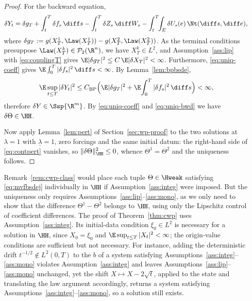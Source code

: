 \begin{proof}
For the backward equation,
\[
\delta Y_t=\delta g_T+\int_t^T\delta f_s\,\diff s-\int_t^T\delta Z_s\,\diff W_s
-\int_t^T\!\!\int_E\delta U_s(e)\,\Nt(\diff s,\diff e),
\]
where $\delta g_T:=g(X^1_T,\Law(X^1_T))-g(X^2_T,\Law(X^2_T))$. As the terminal
conditions presuppose $\Law(X^k_T)\in\mathcal P_2(\R^n)$, we have $X^k_T\in L^2$, and
Assumption~\ref{ass:lip} with \eqref{eq:couplingT} gives
$\E|\delta g_T|^2\le C\,\E|\delta X_T|^2<\infty$. Furthermore, \eqref{eq:uniq-coeff}
gives $\E\int_0^T|\delta f_s|^2\,\diff s<\infty$. By Lemma~\ref{lem:bpbsde},
\begin{equation}\label{eq:uniq-bwd}
\E\sup_{t\le T}|\delta Y_t|^2
\le C_{\mathrm{BP}}\Big(\E|\delta g_T|^2+\E\!\int_0^T|\delta f_s|^2\,\diff s\Big)
<\infty ,
\end{equation}
therefore $\delta Y\in\Ssp{\R^m}$. By \eqref{eq:uniq-coeff} and \eqref{eq:uniq-bwd} we
have $\delta\Theta\in\HH$.

Now apply Lemma~\ref{lem:pert} of Section~\ref{sec:wp-proof} to the two solutions at
$\lambda=1$ with $\underline\lambda=1$, zero forcings and the same initial datum:
the right-hand side of \eqref{eq:contpert} vanishes, so
$\|\delta\Theta\|_{\HH}^2\le0$, whence $\Theta^1=\Theta^2$ and the uniqueness follows.
\end{proof}

\begin{remark}\label{rem:uniq-no-integ}
Remark~\ref{rem:cwp-class} would place each tuple $\Theta\in\Hweak$ satisfying
\eqref{eq:mvfbsdej} individually in $\HH$ if Assumption~\ref{ass:integ} were imposed. But the uniqueness only requires
Assumptions~\ref{ass:lip}--\ref{ass:mono}, as we only need to show that the difference
$\Theta^1-\Theta^2$ belongs to $\HH$, using only the Lipschitz control of coefficient
differences. The proof of Theorem~\ref{thm:cwp} uses Assumption~\ref{ass:integ}. Its
initial-data condition $\xi_0\in L^2$ is necessary for a solution in $\HH$, since
$X_0=\xi_0$ and $\E\sup_{t\le T}|X_t|^2<\infty$; the origin-value conditions are sufficient
but not necessary. For instance, adding the deterministic drift $t^{-1/2}\notin L^2(0,T)$ to
the $b$ of a system satisfying Assumptions~\ref{ass:integ}--\ref{ass:mono} violates
Assumption~\ref{ass:integ} and leaves Assumptions~\ref{ass:lip}--\ref{ass:mono} unchanged,
yet the shift $X\mapsto X-2\sqrt t$, applied to the state and translating the law argument
accordingly, returns a system satisfying Assumptions~\ref{ass:integ}--\ref{ass:mono}, so a
solution still exists.
\end{remark}

